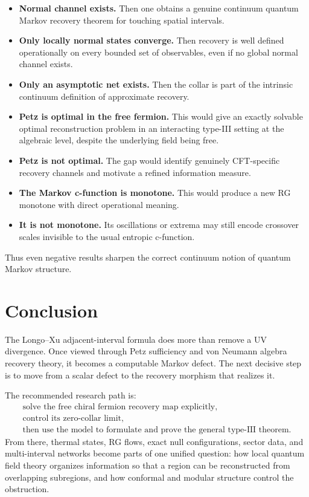 \documentclass[11pt]{article}
\theoremstyle{accenttheorem}
\theoremstyle{definition}
\newcommand{\1}{\mathbf{1}}
\begin{document}
\begin{itemize}
\item \textbf{Normal channel exists.}  Then one obtains a genuine continuum quantum Markov recovery theorem for touching spatial intervals.

\item \textbf{Only locally normal states converge.}  Then recovery is well defined operationally on every bounded set of observables, even if no global normal channel exists.

\item \textbf{Only an asymptotic net exists.}  Then the collar is part of the intrinsic continuum definition of approximate recovery.

\item \textbf{Petz is optimal in the free fermion.}  This would give an exactly solvable optimal reconstruction problem in an interacting type-III setting at the algebraic level, despite the underlying field being free.

\item \textbf{Petz is not optimal.}  The gap would identify genuinely CFT-specific recovery channels and motivate a refined information measure.

\item \textbf{The Markov c-function is monotone.}  This would produce a new RG monotone with direct operational meaning.

\item \textbf{It is not monotone.}  Its oscillations or extrema may still encode crossover scales invisible to the usual entropic c-function.
\end{itemize}

Thus even negative results sharpen the correct continuum notion of quantum Markov structure.

\section{Conclusion}

The Longo--Xu adjacent-interval formula does more than remove a UV divergence.  Once viewed through Petz sufficiency and von Neumann algebra recovery theory, it becomes a computable Markov defect.  The next decisive step is to move from a scalar defect to the recovery morphism that realizes it.

The recommended research path is:
\[
\boxed{
\begin{gathered}
\text{solve the free chiral fermion recovery map explicitly,}\\
\text{control its zero-collar limit,}\\
\text{then use the model to formulate and prove the general type-III theorem.}
\end{gathered}}
\]
From there, thermal states, RG flows, exact null configurations, sector data, and multi-interval networks become parts of one unified question: how local quantum field theory organizes information so that a region can be reconstructed from overlapping subregions, and how conformal and modular structure control the obstruction.
\end{document}
